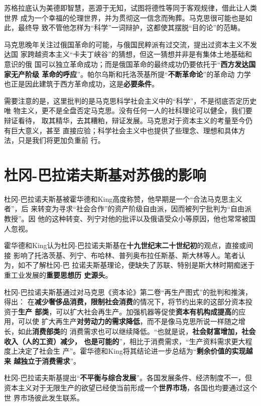 苏格拉底认为美德即智慧，恶源于无知，试图将德性等同于客观规律，借此让人类世界
成为一个幸福的伦理世界，并为贯彻这一信念而殉葬。马克思很可能也是如此，最终导
致不管他怎样为“科学”一词辩护，这都使其摆脱“目的论”的范畴。

马克思晚年关注过俄国革命的可能，与俄国民粹派有过交流，提出过资本主义不发达国
家跨越资本主义“卡夫丁峡谷”的猜想，但这一猜想并非是有集体土地基础和意识的俄
国可以独立革命成功；而是俄国革命的最终成功仍要依托于“\textbf{西方发达国家无产阶级
  革命的呼应}”。\cite{mamincui}帕尔乌斯和托洛茨基所提“\textbf{不断革命论}”的革命动
力学也正是因此建筑于西方革命成功，这是\textbf{必要条件}。

需要注意的是，这里批判的是马克思科学社会主义中的“科学”，不是彻底否定历史唯
物主义，更不是全盘否定马克思。没有任何一人的社科理论可以健全，我们要辩证看待，
取其精华，去其糟粕，辩证发展。马克思对于资本主义的考量至今仍有巨大意义，甚至
直接应验；科学社会主义中也提供了些理念、理想和具体方法，只是我们将更加负重前
行。

\section{杜冈-巴拉诺夫斯基对苏俄的影响}

杜冈-巴拉诺夫斯基被霍华德和King高度称赞，他早期是一个“合法马克思主义者”，后
来转变为寻求“社会合作”的资产阶级自由派，因而被列宁批判为“自由派教授”。因
他的这种转变、列宁对他的批评以及俄语受众小等原因，他也常常被国人忽视。

霍华德和King认为杜冈-巴拉诺夫斯基在\textbf{十九世纪末二十世纪初}的观点，直接或间接
影响了托洛茨基、列宁、布哈林、普列奥布拉任斯基、斯大林等人。笔者认为，如不了解杜冈-巴
拉诺夫斯基理论，便缺失了苏联、特别是斯大林时期痴迷于重工业发展的\textbf{重要思想历
  史源头}。

杜冈-巴拉诺夫斯基通过对马克思《资本论》第二卷“再生产图式”的批判和推演，得出：
在\textbf{减少奢侈品消费，限制社会消费}的情况下，将节约出来的这部分资本投资于\textbf{生产
  部类}，可以扩大社会再生产。加强机器等促使\textbf{资本有机构成提高}的应用，可以使
扩大再生产\textbf{对劳动力的需求降低}，而不是像马克思所说一样随之增长，如此\textbf{消费部类}的
消费需求也可以继续降低。“也就是说，\textbf{社会财富增加，社会收入（人的工资）减少，
  也是可能的}”，相比于消费需求，“生产资料需求更大程度上决定了社会生
产”。\cite{lijingdugang}霍华德和King将其结论进一步总结为“\textbf{剩余价值的实现越来
  越独立于消费需求}”。

杜冈-巴拉诺夫斯基提出“\textbf{不平衡与综合发展}”。各国发展条件、经济制度不一，但
资本主义对于无限生产的欲望已经使当前形成一个\textbf{世界市场}，各国也均要通过这个世
界市场彼此发生联系。

